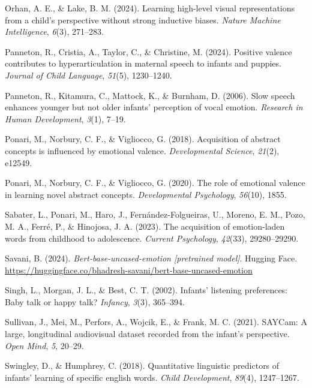 \documentclass[10pt, letterpaper]{article}
\begin{document}
\begin{CSLReferences}{1}{0}
Orhan, A. E., \& Lake, B. M. (2024). Learning high-level visual
representations from a child's perspective without strong inductive
biases. \emph{Nature Machine Intelligence}, \emph{6}(3), 271--283.

Panneton, R., Cristia, A., Taylor, C., \& Christine, M. (2024). Positive
valence contributes to hyperarticulation in maternal speech to infants
and puppies. \emph{Journal of Child Language}, \emph{51}(5), 1230--1240.

Panneton, R., Kitamura, C., Mattock, K., \& Burnham, D. (2006). Slow
speech enhances younger but not older infants' perception of vocal
emotion. \emph{Research in Human Development}, \emph{3}(1), 7--19.

Ponari, M., Norbury, C. F., \& Vigliocco, G. (2018). Acquisition of
abstract concepts is influenced by emotional valence.
\emph{Developmental Science}, \emph{21}(2), e12549.

Ponari, M., Norbury, C. F., \& Vigliocco, G. (2020). The role of
emotional valence in learning novel abstract concepts.
\emph{Developmental Psychology}, \emph{56}(10), 1855.

Sabater, L., Ponari, M., Haro, J., Fernández-Folgueiras, U., Moreno, E.
M., Pozo, M. A., Ferré, P., \& Hinojosa, J. A. (2023). The acquisition
of emotion-laden words from childhood to adolescence. \emph{Current
Psychology}, \emph{42}(33), 29280--29290.

Savani, B. (2024). \emph{Bert-base-uncased-emotion {[}pretrained
model{]}}. Hugging Face.
\url{https://huggingface.co/bhadresh-savani/bert-base-uncased-emotion}

Singh, L., Morgan, J. L., \& Best, C. T. (2002). Infants' listening
preferences: Baby talk or happy talk? \emph{Infancy}, \emph{3}(3),
365--394.

Sullivan, J., Mei, M., Perfors, A., Wojcik, E., \& Frank, M. C. (2021).
SAYCam: A large, longitudinal audiovisual dataset recorded from the
infant's perspective. \emph{Open Mind}, \emph{5}, 20--29.

Swingley, D., \& Humphrey, C. (2018). Quantitative linguistic predictors
of infants' learning of specific english words. \emph{Child
Development}, \emph{89}(4), 1247--1267.


\end{CSLReferences}
\end{document}
